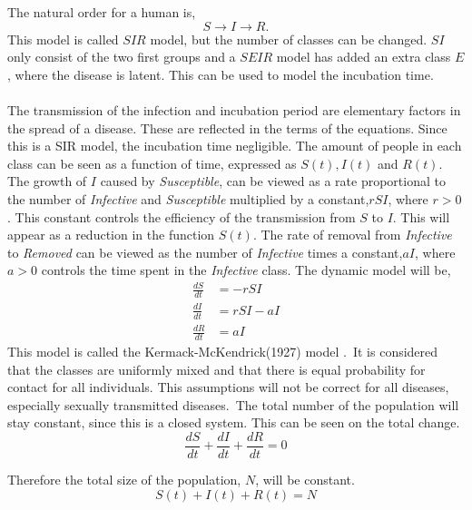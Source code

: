 \documentclass[%
twoside,                 %
final,                   %
10pt]{article}
\begin{document}
\noindent
The natural order for a human is,
\begin{equation}
S \rightarrow I \rightarrow R.
\end{equation}
This model is called $SIR$ model, but the number of classes can be changed. $SI$ only consist of the two first groups and a $SEIR$ model has added an extra class $E$, where the disease is latent. This can be used to model the incubation time. 
\\
\\
The transmission of the infection and incubation period are elementary factors in the spread of a disease. These are reflected in the terms of the equations. Since this is a SIR model, the incubation time negligible. The amount of people in each class can be seen as a function of time, expressed as $S(t),I(t)$ and $R(t)$. The growth of $I$ caused by \emph{Susceptible}, can be viewed as a rate proportional to the number of \emph{Infective} and \emph{Susceptible} multiplied by a constant,$rSI$, where $r>0$. This constant controls the efficiency of the transmission from $S$ to $I$. This will appear as a reduction in the function $S(t)$. The rate of removal from \emph{Infective} to \emph{Removed} can be viewed as the number of \emph{Infective} times a constant,$aI$, where $a>0$ controls the time spent in the \emph{Infective} class. The dynamic model will be,
\begin{equation} \label{eq:SIR_model}
	\begin{aligned} 
	\frac{dS}{dt} &= -rSI \\ 
	\frac{dI}{dt} &= rSI-aI \\ 
	\frac{dR}{dt} &= aI 
	\end{aligned}
\end{equation}
This model is called the Kermack-McKendrick(1927) model \cite[p.~320]{murray2002mathematical}.~It is considered that the classes are uniformly mixed and that there is equal probability for contact for all individuals. This assumptions will not be correct for all diseases, especially sexually transmitted diseases. The total number of the population will stay constant, since this is a closed system. This can be seen on the total change.
\begin{equation}
\frac{dS}{dt} + \frac{dI}{dt} + \frac{dR}{dt} = 0
\end{equation}

Therefore the total size of the population, $N$, will be constant. 
\begin{equation} \label{eq:SIR_N}
S(t)+I(t)+R(t) = N
\end{equation}
\end{document}
